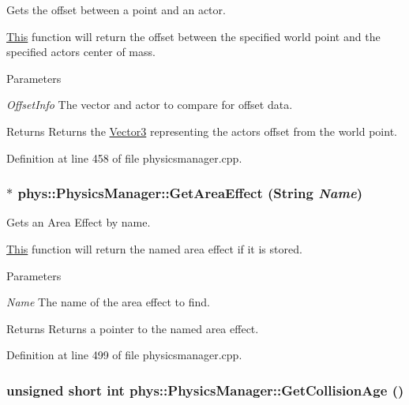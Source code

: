 Gets the offset between a point and an actor. 

\hyperlink{structThis}{This} function will return the offset between the specified world point and the specified actors center of mass. 
\begin{DoxyParams}{Parameters}
\item[{\em OffsetInfo}]The vector and actor to compare for offset data. \end{DoxyParams}
\begin{DoxyReturn}{Returns}
Returns the \hyperlink{classphys_1_1Vector3}{Vector3} representing the actors offset from the world point. 
\end{DoxyReturn}


Definition at line 458 of file physicsmanager.cpp.

\hypertarget{classphys_1_1PhysicsManager_a36b575504b1de592ee24d08ebf1fd620}{
\subsubsection[{GetAreaEffect}]{ $\ast$ phys::PhysicsManager::GetAreaEffect ({\bf String} {\em Name})}}
\label{d3/dcc/classphys_1_1PhysicsManager_a36b575504b1de592ee24d08ebf1fd620}


Gets an Area Effect by name. 

\hyperlink{structThis}{This} function will return the named area effect if it is stored. 
\begin{DoxyParams}{Parameters}
\item[{\em Name}]The name of the area effect to find. \end{DoxyParams}
\begin{DoxyReturn}{Returns}
Returns a pointer to the named area effect. 
\end{DoxyReturn}


Definition at line 499 of file physicsmanager.cpp.

\hypertarget{classphys_1_1PhysicsManager_a4232e8cd52e70b623ef30c40be6cdb4a}{
\subsubsection[{GetCollisionAge}]{\setlength{\rightskip}{0pt plus 5cm}unsigned short int phys::PhysicsManager::GetCollisionAge ()}}
\label{d3/dcc/classphys_1_1PhysicsManager_a4232e8cd52e70b623ef30c40be6cdb4a}


